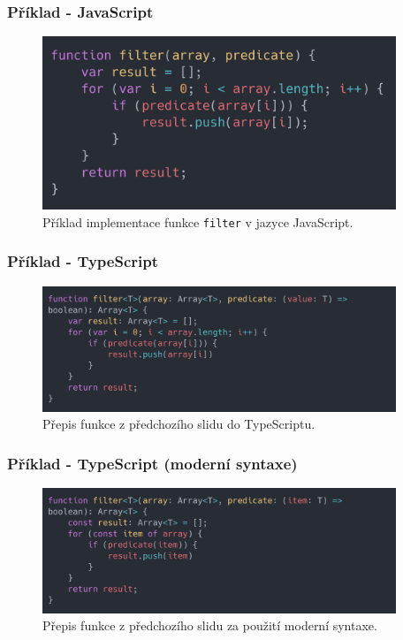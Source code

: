 \begin{frame}
    \frametitle{Příklad - JavaScript}
    \begin{figure}
        \includegraphics[width=300pt]{../resources/snippets/tsExample/example.js.png}
        \caption[Vanilla JavaScript]{Příklad implementace funkce \texttt{filter}\cite{wikipedia:filter_function} v jazyce JavaScript.}
    \end{figure}
\end{frame}

\begin{frame}
    \frametitle{Příklad - TypeScript}
    \begin{figure}
        \includegraphics[width=300pt]{../resources/snippets/tsExample/example_rewritten.ts.png}
        \caption[Přepis do TypeScriptu]{Přepis funkce z předchozího slidu do TypeScriptu.}
    \end{figure}
\end{frame}

\begin{frame}
    \frametitle{Příklad - TypeScript (moderní syntaxe)}
    \begin{figure}
        \includegraphics[width=300pt]{../resources/snippets/tsExample/example_modern.ts.png}
        \caption[TypeScript s moderní syntaxí]{Přepis funkce z předchozího slidu za použití moderní syntaxe.}
    \end{figure}
\end{frame}